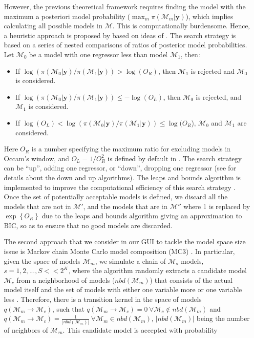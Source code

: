 However, the previous theoretical framework requires finding the model with the maximum a posteriori model probability ($\max_m {\pi(\mathcal{M}_m|\bm{y})}$), which implies calculating all possible models in $\mathcal{M}$. This is computationally burdensome. Hence, a heuristic approach is proposed by \cite{Raftery2012} based on ideas of \cite{Madigan1994}. The search strategy is based on a series of nested comparisons of ratios of posterior model probabilities. Let $\mathcal{M}_0$ be a model with one regressor less than model $\mathcal{M}_1$, then:
\begin{itemize}
	\item If $\log(\pi(\mathcal{M}_0|\bm{y})/\pi(\mathcal{M}_1|\bm{y}))>\log(O_R)$, then $\mathcal{M}_1$ is rejected and $\mathcal{M}_0$ is considered.
	\item If $\log(\pi(\mathcal{M}_0|\bm{y})/\pi(\mathcal{M}_1|\bm{y}))\leq -\log(O_L)$, then $\mathcal{M}_0$ is rejected, and $\mathcal{M}_1$ is considered.
	 \item If $\log(O_L)<\log(\pi(\mathcal{M}_0|\bm{y})/\pi(\mathcal{M}_1|\bm{y}))\leq \log(O_R$), $\mathcal{M}_0$ and $\mathcal{M}_1$ are considered.
\end{itemize} 
Here $O_R$ is a number specifying the maximum ratio for excluding models in Occam's window, and $O_L=1/O_R^{2}$ is defined by default in \cite{Raftery2012}. The search strategy can be ``up'', adding one regressor, or ``down'', dropping one regressor (see \cite{Madigan1994} for details about the down and up algorithms). The leaps and bounds algorithm \cite{Furnival1974} is implemented to improve the computational efficiency of this search strategy \cite{Raftery2012}. Once the set of potentially acceptable models is defined, we discard all the models that are not in $\mathcal{M}'$, and the models that are in $\mathcal{M}''$ where 1 is replaced by $\exp\left\{O_R\right\}$ due to the leaps and bounds algorithm giving an approximation to BIC, so as to ensure that no good models are discarded.

The second approach that we consider in our GUI to tackle the model space size issue is Markov chain Monte Carlo model composition (MC3) \cite{madigan1995bayesian1}.
In particular, given the space of models $\mathcal{M}_m$, we simulate a chain of $\mathcal{M}_s$ models, $s = 1, 2, ..., S<<2^K$, where the algorithm randomly extracts a candidate model $\mathcal{M}_c$ from a neighborhood of models ($nbd(\mathcal{M}_m)$) that consists of the actual model itself and the set of models with either one variable more or one variable less \cite{Raftery1997}. Therefore, there is a transition kernel in the space of models $q(\mathcal{M}_m\rightarrow \mathcal{M}_c)$, such that $q(\mathcal{M}_m\rightarrow \mathcal{M}_{c})=0 \ \forall \mathcal{M}_{c}\notin nbd(\mathcal{M}_m)$ and $q(\mathcal{M}_m\rightarrow \mathcal{M}_{c})=\frac{1}{|nbd(\mathcal{M}_m)|} \ \forall \mathcal{M}_m\in nbd(\mathcal{M}_m)$, $|nbd(\mathcal{M}_m)|$ being the number of neighbors of $\mathcal{M}_m$. This candidate model is accepted with probability

